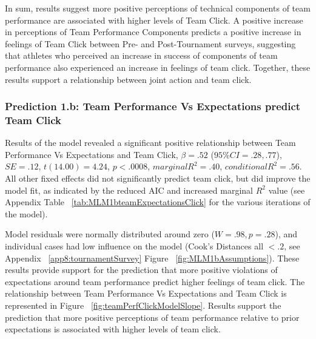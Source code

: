 \begin{CJK}{UTF8}{gbsn}
In sum, results suggest more positive perceptions of technical components of team performance are associated with higher levels of Team Click. A positive increase in perceptions of Team Performance Components predicts a positive increase in feelings of Team Click between Pre- and Post-Tournament surveys, suggesting that athletes who perceived an increase in success of components of team performance also experienced an increase in feelings of team click. Together, these results support a relationship between joint action and team click.






\subsubsection{Prediction 1.b: Team Performance Vs Expectations predict Team Click}

Results of the model revealed a significant positive relationship between Team Performance Vs Expectations and Team Click, $\beta = .52$ ($95\% CI =  .28, .77$), $SE = .12$, $t(14.00) = 4.24$, $p < .0008$, $marginal R^2 = .40$, $conditional R^2 = .56$.  All other fixed effects did not significantly predict team click, but did improve the model fit, as indicated by the reduced AIC and increased marginal $R^2$ value (see Appendix Table ~\ref{tab:MLM1bteamExpectationsClick} for the various iterations of the model).

Model residuals were normally distributed around zero ($W = .98, p = .28$), and individual cases had low influence on the model (Cook's Distances all $< .2$, see Appendix ~\ref{app8:tournamentSurvey} Figure ~\ref{fig:MLM1bAssumptions}).  These results provide support for the prediction that more positive violations of expectations around team performance predict higher feelings of team click.  The relationship between Team Performance Vs Expectations and Team Click is represented in Figure ~\ref{fig:teamPerfClickModelSlope}.  Results support the prediction that more positive perceptions of team performance relative to prior expectations is associated with higher levels of team click.



\end{CJK}
